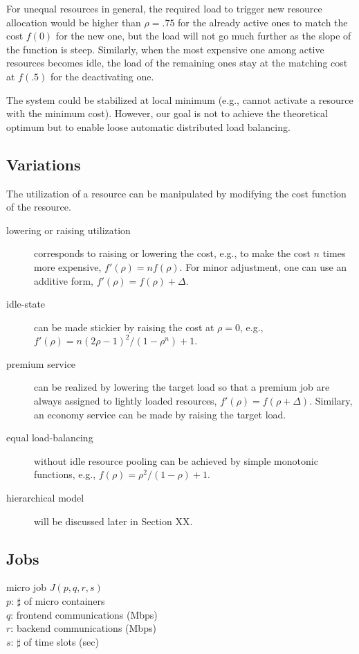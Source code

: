 For unequal resources in general, the required load to trigger new
resource allocation would be higher than $\rho = .75$ for the already
active ones to match the cost $f(0)$ for the new one, but the load
will not go much further as the slope of the function is steep.
Similarly, when the most expensive one among active resources becomes
idle, the load of the remaining ones stay at the matching cost at
$f(.5)$ for the deactivating one.

The system could be stabilized at local minimum (e.g., cannot activate
a resource with the minimum cost).
However, our goal is not to achieve the theoretical optimum but to
enable loose automatic distributed load balancing.

\subsection{Variations}

The utilization of a resource can be manipulated by modifying the cost
function of the resource.
\begin{description}
\item	[lowering or raising utilization] corresponds to raising or
	lowering the cost, e.g., to make the cost $n$ times
        more expensive, $f'(\rho) = n f(\rho)$.
        For minor adjustment, one can use an additive form,
        $f'(\rho) = f(\rho) + \Delta$.
\item	[idle-state] can be made stickier by raising the cost at
	  $\rho = 0$,
  	e.g., $f'(\rho) = n (2\rho - 1)^{2}/(1 - \rho^{n}) + 1$.
\item	[premium service] can be realized by lowering the target load so
        that a premium job are always assigned to lightly loaded resources, 
        $f'(\rho) = f(\rho + \Delta)$.
        Similary, an economy service can be made by raising the target load.
\item	[equal load-balancing] without idle resource pooling can be
        achieved by simple monotonic functions, e.g.,
        $f(\rho) = \rho^{2}/(1 - \rho) + 1$.
\item	[hierarchical model] will be discussed later in Section XX.
\end{description}

\subsection{Jobs}

micro job $J(p, q, r, s)$	\\
$p$: $\sharp$ of micro containers	\\
$q$: frontend communications (Mbps)	\\
$r$: backend communications (Mbps)	\\
$s$: $\sharp$ of time slots (sec)	\\

